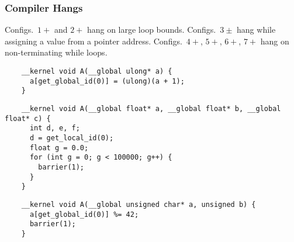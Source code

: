 

\subsubsection{Compiler Hangs}
Configs.\ $1+$ and $2+$ hang on large loop bounds. Configs.\ $3\pm$ hang while assigning a value from a pointer address. Configs.\ $4+$, $5+$, $6+$, $7+$ hang on non-terminating while loops.

\newsavebox{\IntelPtrCompilerHang}
\begin{lrbox}{\IntelPtrCompilerHang}
  \hspace{1.5em}
  \begin{lstlisting}
    __kernel void A(__global ulong* a) {
      a[get_global_id(0)] = (ulong)(a + 1);
    }
  \end{lstlisting}
\end{lrbox}


\newsavebox{\IntelOptCompilerHang}
\begin{lrbox}{\IntelOptCompilerHang}
  \hspace{1.5em}
  \begin{lstlisting}
    __kernel void A(__global float* a, __global float* b, __global float* c) {
      int d, e, f;
      d = get_local_id(0);
      float g = 0.0;
      for (int g = 0; g < 100000; g++) {
        barrier(1);
      }
    }
  \end{lstlisting}
\end{lrbox}

\newsavebox{\XeonPhiSpin}
\begin{lrbox}{\XeonPhiSpin}
  \hspace{1.5em}
  \begin{lstlisting}
    __kernel void A(__global unsigned char* a, unsigned b) {
      a[get_global_id(0)] %= 42;
      barrier(1);
    }
  \end{lstlisting}
\end{lrbox}

